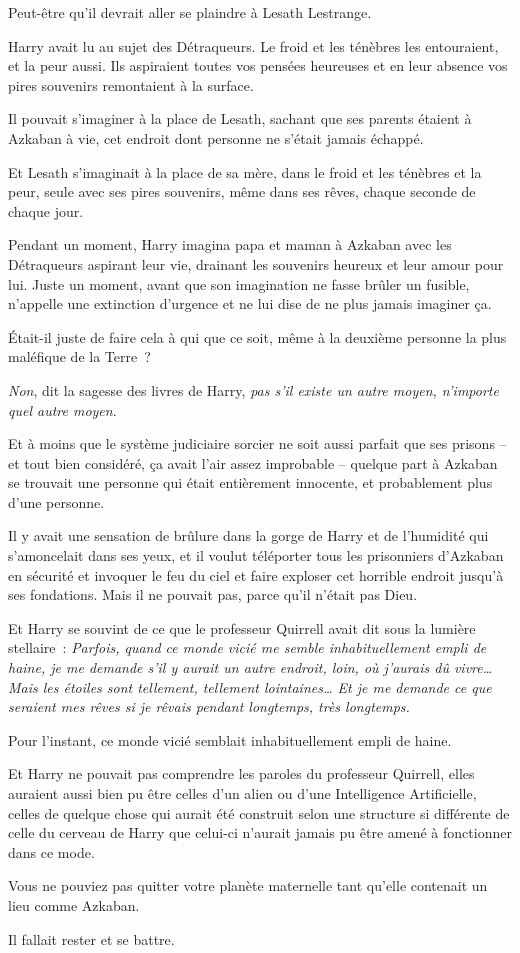 Peut-être qu'il devrait aller se plaindre à Lesath Lestrange.

Harry avait lu au sujet des Détraqueurs.
Le froid et les ténèbres les entouraient, et la peur aussi.
Ils aspiraient toutes vos pensées heureuses et en leur absence vos pires souvenirs remontaient à la surface.

Il pouvait s'imaginer à la place de Lesath, sachant que ses parents étaient à Azkaban à vie, cet endroit dont personne ne s'était jamais échappé.

Et Lesath s'imaginait à la place de sa mère, dans le froid et les ténèbres et la peur, seule avec ses pires souvenirs, même dans ses rêves, chaque seconde de chaque jour.

Pendant un moment, Harry imagina papa et maman à Azkaban avec les Détraqueurs aspirant leur vie, drainant les souvenirs heureux et leur amour pour lui.
Juste un moment, avant que son imagination ne fasse brûler un fusible, n'appelle une extinction d'urgence et ne lui dise de ne plus jamais imaginer ça.

Était-il juste de faire cela à qui que ce soit, même à la deuxième personne la plus maléfique de la Terre~?

\emph{Non}, dit la sagesse des livres de Harry, \emph{pas s'il existe un autre moyen, n'importe quel autre moyen}.

Et à moins que le système judiciaire sorcier ne soit aussi parfait que ses prisons -- et tout bien considéré, ça avait l'air assez improbable -- quelque part à Azkaban se trouvait une personne qui était entièrement innocente, et probablement plus d'une personne.

Il y avait une sensation de brûlure dans la gorge de Harry et de l'humidité qui s'amoncelait dans ses yeux, et il voulut téléporter tous les prisonniers d'Azkaban en sécurité et invoquer le feu du ciel et faire exploser cet horrible endroit jusqu'à ses fondations.
Mais il ne pouvait pas, parce qu'il n'était pas Dieu.

Et Harry se souvint de ce que le professeur Quirrell avait dit sous la lumière stellaire~: \emph{Parfois, quand ce monde vicié me semble inhabituellement empli de haine, je me demande s'il y aurait un autre endroit, loin, où j'aurais dû vivre…
Mais les étoiles sont tellement, tellement lointaines…
Et je me demande ce que seraient mes rêves si je rêvais pendant longtemps, très longtemps.}

Pour l'instant, ce monde vicié semblait inhabituellement empli de haine.

Et Harry ne pouvait pas comprendre les paroles du professeur Quirrell, elles auraient aussi bien pu être celles d'un alien ou d'une Intelligence Artificielle, celles de quelque chose qui aurait été construit selon une structure si différente de celle du cerveau de Harry que celui-ci n'aurait jamais pu être amené à fonctionner dans ce mode.

Vous ne pouviez pas quitter votre planète maternelle tant qu'elle contenait un lieu comme Azkaban.

Il fallait rester et se battre.
